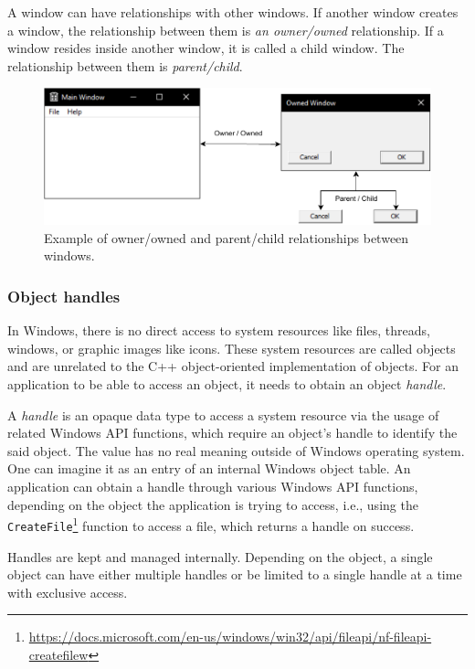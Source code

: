 A window can have relationships with other windows. If another window creates a window, the relationship between them is \textit{an owner/owned} relationship. If a window resides inside another window, it is called a child window. The relationship between them is \textit{parent/child}.\cite{WinWindow}
\begin{figure}[htbp]
	\centering
	\includegraphics[width=\columnwidth]{obrazky-figures/windows_rels.pdf}
	\caption{Example of owner/owned and parent/child relationships between windows.}
	\label{windowsExample}
\end{figure}

\subsubsection{Object handles}
\label{ch2handle}
In Windows, there is no direct access to system resources like files, threads, windows, or graphic images like icons. These system resources are called objects and are unrelated to the C++ object-oriented implementation of objects. For an application to be able to access an object, it needs to obtain an object \textit{handle}.

A \textit{handle} is an opaque data type to access a system resource via the usage of related Windows API functions, which require an object's handle to identify the said object. The value has no real meaning outside of Windows operating system. One can imagine it as an entry of an internal Windows object table. An application can obtain a handle through various Windows API functions, depending on the object the application is trying to access, i.e., using the \lstinline{CreateFile}\footnote{\url{https://docs.microsoft.com/en-us/windows/win32/api/fileapi/nf-fileapi-createfilew}} function to access a file, which returns a handle on success.\cite{HandlesAndObjects}

Handles are kept and managed internally. Depending on the object, a single object can have either multiple handles or be limited to a single handle at a time with exclusive access.\cite{WinHandleLimits}

